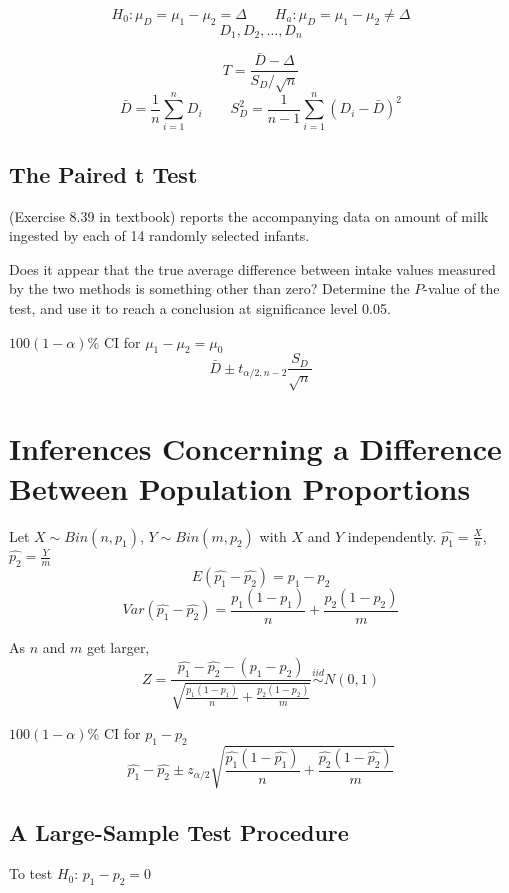 \[H_0:\mu_D=\mu_1-\mu_2=\Delta \qquad H_a:\mu_D=\mu_1-\mu_2 \neq\Delta\]
\[D_1,D_2,\dots,D_n\]

\[T=\frac{\bar{D}-\Delta}{S_D/\sqrt{n}}\]
\[\bar{D}=\frac{1}{n}\sum_{i=1}^n D_i \qquad  S_D^2=\frac{1}{n-1}\sum_{i=1}^n (D_i-\bar{D})^2\]

\subsection{The Paired t Test}

\begin{exmp}
(Exercise 8.39 in textbook) reports the accompanying data on amount of milk ingested by each of 14 randomly selected infants.

Does it appear that the true average difference between intake values measured by the two methods is something other than zero? Determine the $P$-value of the test, and use it to reach a conclusion at significance level 0.05.

\end{exmp}

$100(1-\alpha)$\% CI for $\mu_1-\mu_2=\mu_0$
\[\bar{D} \pm t_{\alpha/2,n-2}\frac{S_D}{\sqrt{n}}\]

\section{Inferences Concerning a Difference Between Population Proportions}

\begin{prop}
Let $X\sim Bin(n,p_1)$, $Y\sim Bin(m,p_2)$ with $X$ and $Y$ independently. $\hat{p_1}=\frac{X}{n}$,$\hat{p_2}=\frac{Y}{m}$
\[E(\hat{p_1}-\hat{p_2})=p_1-p_2\]
\[Var(\hat{p_1}-\hat{p_2})=\frac{p_1(1-p_1)}{n}+\frac{p_2(1-p_2)}{m}\]
\end{prop}

As $n$ and $m$ get larger,
\[Z=\frac{\hat{p_1}-\hat{p_2}-(p_1-p_2)}{\sqrt{\frac{p_1(1-p_1)}{n}+\frac{p_2(1-p_2)}{m}}} \overset{iid}{\sim} N(0,1)\]

$100(1-\alpha)$\% CI for $p_1-p_2$
\[\hat{p_1}-\hat{p_2} \pm z_{\alpha/2}\sqrt{\frac{\hat{p_1}(1-\hat{p_1})}{n}+\frac{\hat{p_2}(1-\hat{p_2})}{m}}\]

\subsection{A Large-Sample Test Procedure}

To test $H_0$: $p_1-p_2=0$

